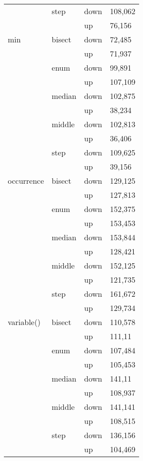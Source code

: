 \begin{longtable}{llll}
          & \multicolumn{1}{l}{step} & down  & 108,062 \\
          &       & up    & 76,156 \\ \hline
    \multicolumn{1}{l}{min} & \multicolumn{1}{l}{bisect} & down  & 72,485 \\
          &       & up    & 71,937 \\
          & \multicolumn{1}{l}{enum} & down  & 99,891 \\
          &       & up    & 107,109 \\
          & \multicolumn{1}{l}{median} & down  & 102,875 \\
          &       & up    & 38,234 \\
          & \multicolumn{1}{l}{middle} & down  & 102,813 \\
          &       & up    & 36,406 \\
          & \multicolumn{1}{l}{step} & down  & 109,625 \\
          &       & up    & 39,156 \\ \hline
    \multicolumn{1}{l}{occurrence} & \multicolumn{1}{l}{bisect} & down  & 129,125 \\
          &       & up    & 127,813 \\
          & \multicolumn{1}{l}{enum} & down  & 152,375 \\
          &       & up    & 153,453 \\
          & \multicolumn{1}{l}{median} & down  & 153,844 \\
          &       & up    & 128,421 \\
          & \multicolumn{1}{l}{middle} & down  & 152,125 \\
          &       & up    & 121,735 \\
          & \multicolumn{1}{l}{step} & down  & 161,672 \\
          &       & up    & 129,734 \\ \hline
    \multicolumn{1}{l}{variable()} & \multicolumn{1}{l}{bisect} & down  & 110,578 \\
          &       & up    & 111,11 \\
          & \multicolumn{1}{l}{enum} & down  & 107,484 \\
          &       & up    & 105,453 \\
          & \multicolumn{1}{l}{median} & down  & 141,11 \\
          &       & up    & 108,937 \\
          & \multicolumn{1}{l}{middle} & down  & 141,141 \\
          &       & up    & 108,515 \\
          & \multicolumn{1}{l}{step} & down  & 136,156 \\
          &       & up    & 104,469 \\
\end{longtable}
